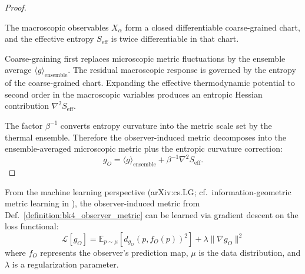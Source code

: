\begin{proof}
\label{proof:bk4_statistical_mechanics}
\leavevmode

\begin{assumption}
The macroscopic observables $X_\alpha$ form a closed differentiable
coarse-grained chart, and the effective entropy $S_{\mathrm{eff}}$ is twice
differentiable in that chart.
\end{assumption}

Coarse-graining first replaces microscopic metric fluctuations by the ensemble
average $\langle g\rangle_{\mathrm{ensemble}}$. The residual macroscopic
response is governed by the entropy of the coarse-grained chart. Expanding the
effective thermodynamic potential to second order in the macroscopic variables
produces an entropic Hessian contribution $\nabla^2S_{\mathrm{eff}}$.

The factor $\beta^{-1}$ converts entropy curvature into the metric scale set by
the thermal ensemble. Therefore the observer-induced metric decomposes into the
ensemble-averaged microscopic metric plus the entropic curvature correction:
\[
g_O=\langle g\rangle_{\mathrm{ensemble}}
    +\beta^{-1}\nabla^2S_{\mathrm{eff}}.
\]
\end{proof}

\begin{theorem}\label{theorem:bk4_ml_metric_learning}
From the machine learning perspective (arXiv:cs.LG; cf.~information-geometric metric learning in \cite{amari2000}), the observer-induced metric from Def.~\ref{definition:bk4_observer_metric} can be learned via gradient descent on the loss functional:
\begin{equation}
    \mathcal{L}[g_O] = \mathbb{E}_{p \sim \mu} \left[ d_{g_O}(p, f_O(p))^2 \right] + \lambda \|\nabla g_O\|^2
\end{equation}
where $f_O$ represents the observer's prediction map, $\mu$ is the data distribution, and $\lambda$ is a regularization parameter.
\end{theorem}


